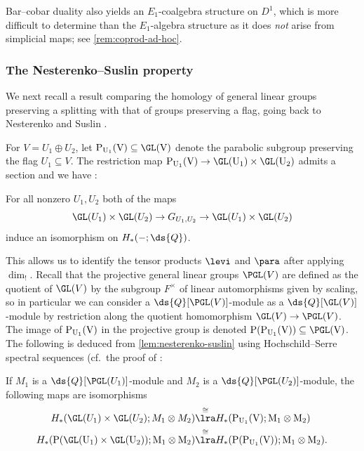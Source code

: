 \documentclass[a4paper]{amsart}
\begin{document}
\begin{remark} Bar--cobar duality also yields an $E_1$-coalgebra structure on $D^1$, which is more difficult to determine than the $E_1$-algebra structure as it does \emph{not} arise from simplicial maps; see \cref{rem:coprod-ad-hoc}.
\end{remark}

\subsubsection{The Nesterenko--Suslin property} \label{sec:nesterenko-suslin} We next recall a result comparing the homology of general linear groups preserving a splitting with that of groups preserving a flag, going back to Nesterenko and Suslin \cite[Section 1]{NesterenkoSuslin}.

For $V = U_1 \oplus U_2$, let $\rm{P}_{U_1}(V) \subseteq \GL(V)$ denote the parabolic subgroup preserving the flag $U_1 \subseteq V$. The restriction map $\rm{P}_{U_1}(V) \to \GL(U_1) \times \GL(U_2)$ admits a section and we have \cite[Theorem 1.1]{NesterenkoSuslin} \cite[Definition 5.12]{GKRW20}:

\begin{lemma} \label{lem:nesterenko-suslin} For all nonzero $U_1,U_2$ both of the maps 
\[\GL(U_1) \times \GL(U_2) \to G_{U_1,U_2} \to \GL(U_1) \times \GL(U_2)\] induce an isomorphism on $H_*(-;\ds{Q})$.
\end{lemma} 

This allows us to identify the tensor products $\levi$ and $\para$ after applying $\dim_!$. Recall that the projective general linear groups $\PGL(V)$ are defined as the quotient of $\GL(V)$ by the subgroup $F^\times$ of linear automorphisms given by scaling, so in particular we can consider a $\ds{Q}[\PGL(V)]$-module as a $\ds{Q}[\GL(V)]$-module by restriction along the quotient homomorphism $\GL(V) \to \PGL(V)$. The image of $\rm{P}_{U_1}(V)$ in the projective group is denoted $\rm{P}(\rm{P}_{U_1}(V)) \subseteq \PGL(V)$. The following is deduced from \cref{lem:nesterenko-suslin} using Hochschild--Serre spectral sequences (cf.~the proof of \cite[Theorem 1.1]{NesterenkoSuslin}:

\begin{lemma}\label{lem:para-levi-comparison-pgl} If $M_1$ is a $\ds{Q}[\PGL(U_1)]$-module and $M_2$ is a $\ds{Q}[\PGL(U_2)]$-module, the following maps are isomorphisms
\begin{align*}H_*(\GL(U_1) \times \GL(U_2);M_1 \otimes M_2) &\overset{\cong}\lra H_*(\rm{P}_{U_1}(V);M_1 \otimes M_2) \\
H_*(\rm{P}(\GL(U_1) \times \GL(U_2));M_1 \otimes M_2) &\overset{\cong}\lra H_*(\rm{P}(\rm{P}_{U_1}(V));M_1 \otimes M_2).\end{align*}
\end{lemma}
\end{document}

